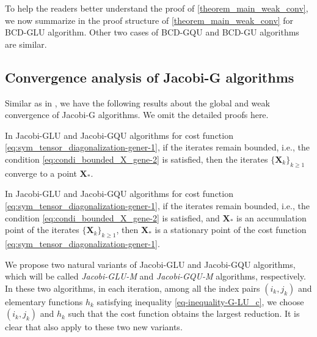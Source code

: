 \documentclass[final,onefignum,onetabnum]{siamart190516}
\newcommand{\matr}[1]{\boldsymbol{#1}}
\begin{document}
To help the readers better understand the proof of \cref{theorem_main_weak_conv}, we now summarize in  the proof structure of \cref{theorem_main_weak_conv} for BCD-GLU algorithm. Other two cases of BCD-GQU and BCD-GU algorithms are similar. 

\begin{figure}[omitted: a diagram of this paper's results, not reproduced here]\label{figure-flow-proof-4-5}\end{figure}

\subsection{Convergence analysis of Jacobi-G algorithms}
 
Similar as in , we have the following results about the global and weak convergence of Jacobi-G algorithms. We omit the detailed proofs here. 

\begin{theorem}\label{theorem:weak_Jaco_Lu-0}
In Jacobi-GLU and Jacobi-GQU algorithms for cost function \cref{eq:sym_tensor_diagonalization-gener-1},
if the iterates remain bounded, i.e., the condition \cref{eq:condi_bounded_X_gene-2} is satisfied, 
then the iterates $\{\matr{X}_{k}\}_{k\ge1}$ converge to a point $\matr{X}_{*}$. 
\end{theorem}

\begin{theorem}\label{theorem_main_weak_conv-Jacobi-GLU-09}
In Jacobi-GLU and Jacobi-GQU algorithms for cost function \cref{eq:sym_tensor_diagonalization-gener-1},
if the iterates remain bounded, i.e., the condition \cref{eq:condi_bounded_X_gene-2} is satisfied, 
and $\matr{X}_*$ is an accumulation point of the iterates $\{\matr{X}_{k}\}_{k\ge1}$,
then $\matr{X}_*$ is a stationary point of the cost function \cref{eq:sym_tensor_diagonalization-gener-1}.
\end{theorem}

\begin{remark}\label{subsec:Glu-M}
We propose two natural variants of Jacobi-GLU and Jacobi-GQU algorithms, which will be called \emph{Jacobi-GLU-M} and \emph{Jacobi-GQU-M} algorithms, respectively.
In these two algorithms, in each iteration, among all the index pairs $(i_k,j_k)$ and elementary functions $h_k$ satisfying inequality \cref{eq-inequality-G-LU_c}, 
we choose $(i_k,j_k)$ and $h_k$ such that the cost function obtains the largest reduction.
It is clear that  also apply to these two new variants. 
\end{remark}
\end{document}
